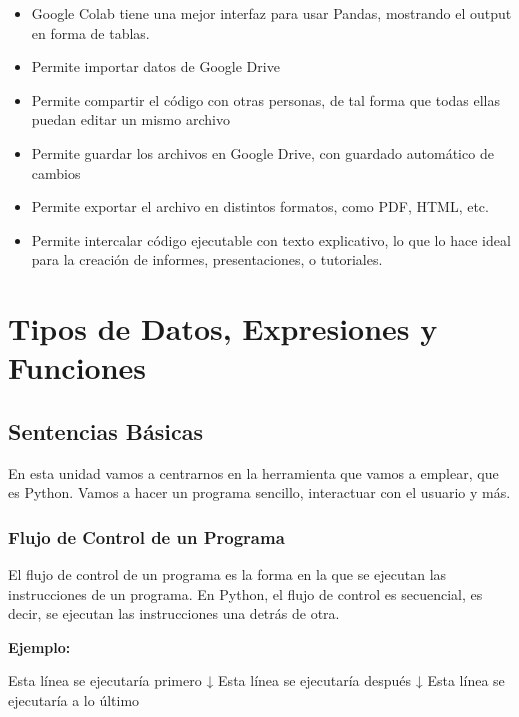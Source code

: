 \documentclass[
  letterpaper,
  DIV=11,
  numbers=noendperiod]{scrreprt}
\newenvironment{Shaded}{\begin{snugshade}}{\end{snugshade}}
\newcommand{\NormalTok}[1]{\textcolor[rgb]{0.00,0.23,0.31}{#1}}
\providecommand{\tightlist}{%
  \setlength{\itemsep}{0pt}\setlength{\parskip}{0pt}}\usepackage{longtable,booktabs,array}
\begin{document}
\begin{itemize}
\tightlist
\item
  Google Colab tiene una mejor interfaz para usar Pandas, mostrando el
  output en forma de tablas.
\item
  Permite importar datos de Google Drive
\item
  Permite compartir el código con otras personas, de tal forma que todas
  ellas puedan editar un mismo archivo
\item
  Permite guardar los archivos en Google Drive, con guardado automático
  de cambios
\item
  Permite exportar el archivo en distintos formatos, como PDF, HTML,
  etc.
\item
  Permite intercalar código ejecutable con texto explicativo, lo que lo
  hace ideal para la creación de informes, presentaciones, o tutoriales.
\end{itemize}


\chapter{Tipos de Datos, Expresiones y
Funciones}\label{tipos-de-datos-expresiones-y-funciones}

\section{Sentencias Básicas}\label{sentencias-buxe1sicas}

En esta unidad vamos a centrarnos en la herramienta que vamos a emplear,
que es Python. Vamos a hacer un programa sencillo, interactuar con el
usuario y más.

\subsection{Flujo de Control de un
Programa}\label{flujo-de-control-de-un-programa}

El flujo de control de un programa es la forma en la que se ejecutan las
instrucciones de un programa. En Python, el flujo de control es
secuencial, es decir, se ejecutan las instrucciones una detrás de otra.

\textbf{Ejemplo:}

\begin{Shaded}
\begin{Highlighting}[]
\NormalTok{Esta línea se ejecutaría primero        ↓}
\NormalTok{Esta línea se ejecutaría después        ↓}
\NormalTok{Esta línea se ejecutaría a lo último    }
\end{Highlighting}
\end{Shaded}
\end{document}
